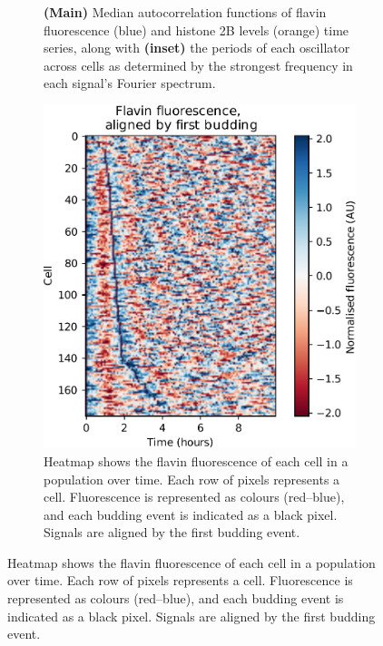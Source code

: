 \begin{figure}
\begin{subfigure}[htpb]{0.4\textwidth}
   \caption{
     \textbf{(Main)} Median autocorrelation functions of flavin fluorescence (blue) and histone 2B levels (orange) time series, %
     along with \textbf{(inset)} the periods of each oscillator across cells as determined by the strongest frequency in each signal's Fourier spectrum.
   }
   \label{fig:biology-highglc-sync-acf}
  \end{subfigure}

  \begin{subfigure}[htpb]{0.4\textwidth}
   \centering
   \includegraphics[width=\textwidth]{heatmap_edit.pdf}
   \caption{
    Heatmap shows the flavin fluorescence of each cell in a population over time.
    Each row of pixels represents a cell.
    Fluorescence is represented as colours (red--blue), and %
    each budding event is indicated as a black pixel.
    Signals are aligned by the first budding event.
   }
   \label{fig:biology-highglc-sync-heatmap}

\end{subfigure}
\end{figure}
